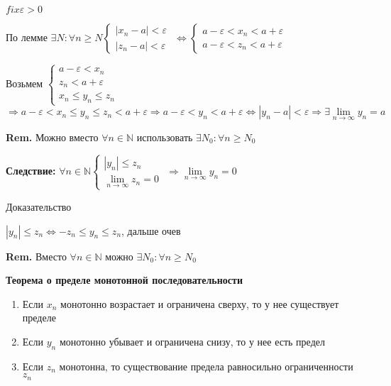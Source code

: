 \documentclass[14pt, letter paper]{article}
\begin{document}
\begin{enumerate}
    $fix \varepsilon > 0$

    По лемме $\exists N : \forall n \geq N \begin{cases}
        |x_n - a| < \varepsilon \\
        |z_n - a| < \varepsilon
    \end{cases}$
    $\Leftrightarrow \begin{cases}
        a - \varepsilon < x_n < a + \varepsilon \\
        a - \varepsilon < z_n < a + \varepsilon
    \end{cases}$

    Возьмем $\begin{cases}
        a - \varepsilon < x_n \\
        z_n < a + \varepsilon \\
        x_n \leq y_n \leq z_n
    \end{cases}$
    $\Rightarrow a - \varepsilon < x_n \leq y_n \leq z_n < a + \varepsilon \Rightarrow a - \varepsilon < y_n < a + \varepsilon \Leftrightarrow |y_n - a| < \varepsilon \Rightarrow \exists \lim\limits_{n \rightarrow \infty}{y_n} = a$

    \textbf{Rem.} Можно вместо $\forall n \in \mathds{N}$ использовать $\exists N_0 : \forall n \geq N_0$

    \textbf{Следствие:} $\forall n \in \mathds{N} \begin{cases}
        |y_n| \leq z_n \\
        \lim\limits_{n \rightarrow \infty}{z_n} = 0
    \end{cases}$
    $\Rightarrow \lim\limits_{n \rightarrow \infty}{y_n} = 0$

    \begin{center}
        Доказательство
    \end{center}

    $|y_n| \leq z_n \Leftrightarrow -z_n \leq y_n \leq z_n$, дальше очев

    \textbf{Rem.} Вместо $\forall n \in \mathds{N}$ можно $\exists N_0 : \forall n \geq N_0$
\end{enumerate}

\textbf{Теорема о пределе монотонной последовательности}

\begin{enumerate}
    \item Если $x_n$ монотонно возрастает и ограничена сверху, то у нее существует пределе
    \item Если $y_n$ монотонно убывает и ограничена снизу, то у нее есть предел
    \item Если $z_n$ монотонна, то существование предела равносильно ограниченности $z_n$
\end{enumerate}
\end{document}
